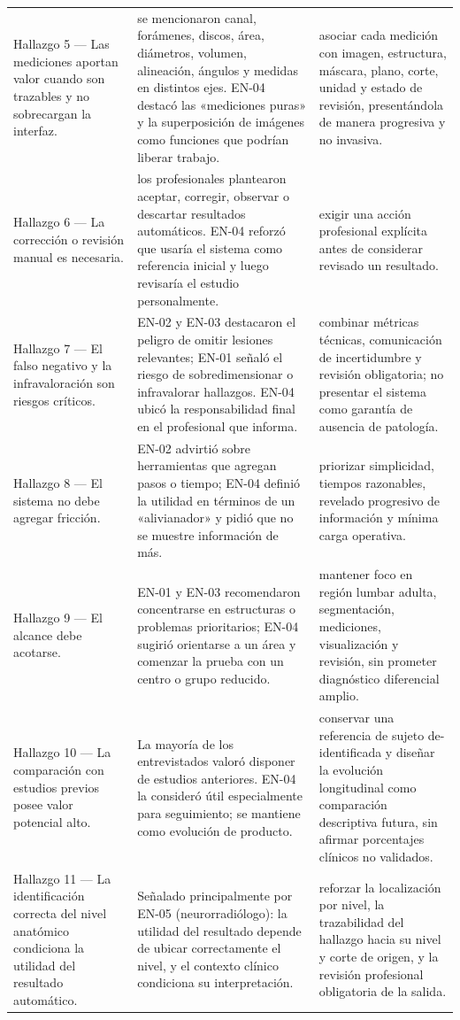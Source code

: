 {\begin{longtable}{>{\raggedright\arraybackslash}p{} >{\raggedright\arraybackslash}p{} >{\raggedright\arraybackslash}p{}}
Hallazgo 5 — Las mediciones aportan valor cuando son trazables y no sobrecargan la interfaz. & se mencionaron canal, forámenes, discos, área, diámetros, volumen, alineación, ángulos y medidas en distintos ejes. EN-04 destacó las «mediciones puras» y la superposición de imágenes como funciones que podrían liberar trabajo. & asociar cada medición con imagen, estructura, máscara, plano, corte, unidad y estado de revisión, presentándola de manera progresiva y no invasiva. \\
Hallazgo 6 — La corrección o revisión manual es necesaria. & los profesionales plantearon aceptar, corregir, observar o descartar resultados automáticos. EN-04 reforzó que usaría el sistema como referencia inicial y luego revisaría el estudio personalmente. & exigir una acción profesional explícita antes de considerar revisado un resultado. \\
Hallazgo 7 — El falso negativo y la infravaloración son riesgos críticos. & EN-02 y EN-03 destacaron el peligro de omitir lesiones relevantes; EN-01 señaló el riesgo de sobredimensionar o infravalorar hallazgos. EN-04 ubicó la responsabilidad final en el profesional que informa. & combinar métricas técnicas, comunicación de incertidumbre y revisión obligatoria; no presentar el sistema como garantía de ausencia de patología. \\
Hallazgo 8 — El sistema no debe agregar fricción. & EN-02 advirtió sobre herramientas que agregan pasos o tiempo; EN-04 definió la utilidad en términos de un «alivianador» y pidió que no se muestre información de más. & priorizar simplicidad, tiempos razonables, revelado progresivo de información y mínima carga operativa. \\
Hallazgo 9 — El alcance debe acotarse. & EN-01 y EN-03 recomendaron concentrarse en estructuras o problemas prioritarios; EN-04 sugirió orientarse a un área y comenzar la prueba con un centro o grupo reducido. & mantener foco en región lumbar adulta, segmentación, mediciones, visualización y revisión, sin prometer diagnóstico diferencial amplio. \\
Hallazgo 10 — La comparación con estudios previos posee valor potencial alto. & La mayoría de los entrevistados valoró disponer de estudios anteriores. EN-04 la consideró útil especialmente para seguimiento; se mantiene como evolución de producto. & conservar una referencia de sujeto de-identificada y diseñar la evolución longitudinal como comparación descriptiva futura, sin afirmar porcentajes clínicos no validados. \\
Hallazgo 11 — La identificación correcta del nivel anatómico condiciona la utilidad del resultado automático. & Señalado principalmente por EN-05 (neurorradiólogo): la utilidad del resultado depende de ubicar correctamente el nivel, y el contexto clínico condiciona su interpretación. & reforzar la localización por nivel, la trazabilidad del hallazgo hacia su nivel y corte de origen, y la revisión profesional obligatoria de la salida. \\
\hline
\end{longtable}
}

